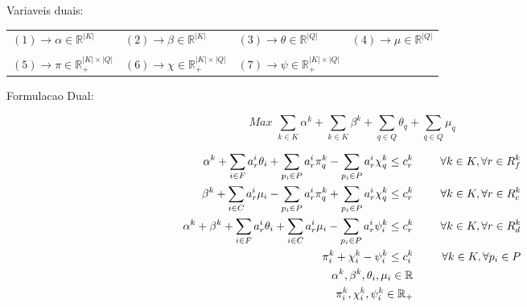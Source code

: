 \documentclass[12pt]{article}
\begin{document}
\noindent Variaveis duais:\\

\begin{tabular}{llll}
$(1) \rightarrow \alpha \in \mathbb{R}^{|K|}$ & $(2) \rightarrow \beta \in \mathbb{R}^{|K|}$ & $(3) \rightarrow \theta \in \mathbb{R}^{|Q|}$ & $(4) \rightarrow \mu \in \mathbb{R}^{|Q|}$ \\
 & & & \\
$(5) \rightarrow \pi \in \mathbb{R}^{|K|\times|Q|}_+$ & $(6) \rightarrow \chi \in \mathbb{R}^{|K|\times|Q|}_+$ & $(7) \rightarrow \psi \in \mathbb{R}^{|K|\times|Q|}_+$ \\
\end{tabular}

\vspace{2cm}

\noindent Formulacao Dual: \vspace{5mm}

\[
Max \,\, \sum\limits_{k \in K}{\alpha^k} + \sum\limits_{k \in K}{\beta^k} + \sum\limits_{q \in Q}{\theta_q} + \sum\limits_{q \in Q}{\mu_q}
\]

\begin{small}
\begin{eqnarray}
\label{eqC01}
  \alpha^k + \sum\limits_{i \in F}{a^i_r \theta_i} + \sum\limits_{p_i \in P}{a^i_r \pi^k_q} - \sum\limits_{p_i \in P}{a^i_r \chi^k_q} \le c^k_r & \hspace{5mm} & \forall k \in K, \forall r \in R^k_f \\
\label{eqC02}
  \beta^k + \sum\limits_{i \in C}{a^i_r \mu_i} - \sum\limits_{p_i \in P}{a^i_r \pi^k_q} + \sum\limits_{p_i \in P}{a^i_r \chi^k_q} \le c^k_r & \hspace{5mm} & \forall k \in K, \forall r \in R^k_c \\
\label{eqC03}  
  \alpha^k + \beta^k + \sum\limits_{i \in F}{a^i_r \theta_i} + \sum\limits_{i \in C}{a^i_r \mu_i} - \sum\limits_{p_i \in P}{a^i_r \psi^k_i} \le c^k_r  & \hspace{5mm} & \forall k \in K, \forall r \in R^k_d \\
\label{eqC04}
  \pi^k_i + \chi^k_i - \psi^k_i \le c^k_i & \hspace{5mm} & \forall k \in K, \forall p_i \in P \\
\label{eqC05}
  \alpha^k, \beta^k, \theta_i, \mu_i \in \mathbb{R}  \\
\label{eqC06}
  \pi^k_i, \chi^k_i, \psi^k_i \in \mathbb{R}_+
\end{eqnarray}
\end{small}
\end{document}
